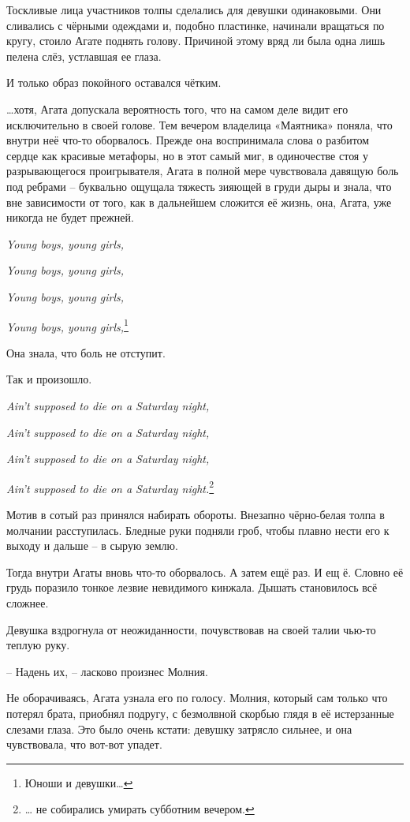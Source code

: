 \documentclass[
  a5paperpaper,
  DIV=11,
  numbers=noendperiod]{scrreprt}
\begin{document}
Тоскливые лица участников толпы сделались для девушки одинаковыми. Они
сливались с чёрными одеждами и, подобно пластинке, начинали вращаться по
кругу, стоило Агате поднять голову. Причиной этому вряд ли была одна
лишь пелена слёз, устлавшая ее глаза.

И только образ покойного оставался чётким.

\ldots хотя, Агата допускала вероятность того, что на самом деле видит
его исключительно в своей голове. Тем вечером владелица «Маятника»
поняла, что внутри неё что-то оборвалось. Прежде она воспринимала слова
о разбитом сердце как красивые метафоры, но в этот самый миг, в
одиночестве стоя у разрывающегося проигрывателя, Агата в полной мере
чувствовала давящую боль под ребрами -- буквально ощущала тяжесть
зияющей в груди дыры и знала, что вне зависимости от того, как в
дальнейшем сложится её жизнь, она, Агата, уже никогда не будет прежней.

\emph{Young boys, young girls,}

\emph{Young boys, young girls,}

\emph{Young boys, young girls,}

\emph{Young boys, young girls,}\footnote{Юноши и девушки\ldots{}}

Она знала, что боль не отступит.

Так и произошло.

\emph{Ain't supposed to die on a Saturday night,}

\emph{Ain't supposed to die on a Saturday night,}

\emph{Ain't supposed to die on a Saturday night,}

\emph{Ain't supposed to die on a Saturday night.}\footnote{\ldots{} не
  собирались умирать субботним вечером.}

Мотив в сотый раз принялся набирать обороты. Внезапно чёрно-белая толпа
в молчании расступилась. Бледные руки подняли гроб, чтобы плавно нести
его к выходу и дальше -- в сырую землю.

Тогда внутри Агаты вновь что-то оборвалось. А затем ещё раз. И ещ ё.
Словно её грудь поразило тонкое лезвие невидимого кинжала. Дышать
становилось всё сложнее.

Девушка вздрогнула от неожиданности, почувствовав на своей талии чью-то
теплую руку.

-- Надень их, -- ласково произнес Молния.

Не оборачиваясь, Агата узнала его по голосу. Молния, который сам только
что потерял брата, приобнял подругу, с безмолвной скорбью глядя в её
истерзанные слезами глаза. Это было очень кстати: девушку затрясло
сильнее, и она чувствовала, что вот-вот упадет.
\end{document}
